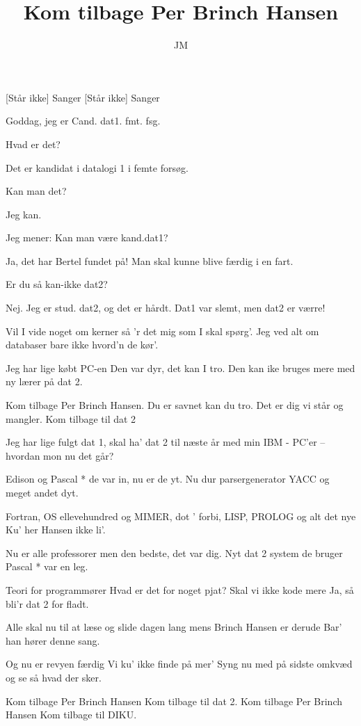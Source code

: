 \documentclass[a4paper,11pt]{article}
\title{Kom tilbage Per Brinch Hansen}
\author{JM}
\begin{document}
\maketitle

\begin{roles}
[Står ikke] Sanger
[Står ikke] Sanger
\end{roles}


\begin{sketch}
 Goddag, jeg er Cand. dat1. fmt. fsg.

 Hvad er det?

 Det er kandidat i datalogi 1 i femte forsøg.

 Kan man det?

 Jeg kan.

 Jeg mener: Kan man være kand.dat1?

 Ja, det har Bertel fundet på! Man skal kunne blive færdig i en fart.

 Er du så kan-ikke dat2?

 Nej. Jeg er stud. dat2, og det er hårdt. Dat1 var slemt, men dat2 er
værre!
\end{sketch}

\begin{song}
Vil I vide noget om kerner
så 'r det mig som I skal spørg'.
Jeg ved alt om databaser
bare ikke hvord'n de kør'.

Jeg har lige købt PC-en
Den var dyr, det kan I tro.
Den kan ike bruges mere
med ny lærer på dat 2.

Kom tilbage Per Brinch Hansen.
Du er savnet kan du tro.
Det er dig vi står og mangler.
Kom tilbage til dat 2

Jeg har lige fulgt dat 1,
skal ha' dat 2 til næste år
med min IBM - PC'er
-- hvordan mon nu det går?

Edison og Pascal *
de var in, nu er de yt.
Nu dur parsergenerator
YACC og meget andet dyt.

Fortran, OS ellevehundred
og MIMER, dot ' forbi,
LISP, PROLOG og alt det nye
Ku' her Hansen ikke li'.

Nu er alle professorer
men den bedste, det var dig.
Nyt dat 2 system de bruger
Pascal * var en leg.

Teori for programmører
Hvad er det for noget pjat?
Skal vi ikke kode mere
Ja, så bli'r dat 2 for fladt.

Alle skal nu til at læse
og slide dagen lang
mens Brinch Hansen er derude
Bar' han hører denne sang.

Og nu er revyen færdig
Vi ku' ikke finde på mer'
Syng nu med på sidste omkvæd
og se så hvad der sker.

Kom tilbage Per Brinch Hansen
Kom tilbage til dat 2.
Kom tilbage Per Brinch Hansen
Kom tilbage til DIKU.
\end{song}
\end{document}
